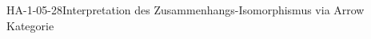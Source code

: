 
\begin{STUD}{HA-1-05-28}{Interpretation des Zusammenhangs-Isomorphismus via Arrow Kategorie}
\end{STUD}
